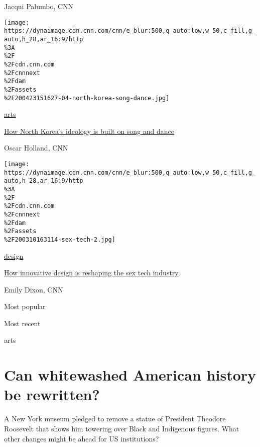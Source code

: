 Jacqui Palumbo, CNN

\href{/style/article/north-korea-song-dance/index.html}{}

\texttt{[image: https://dynaimage.cdn.cnn.com/cnn/e\_blur:500,q\_auto:low,w\_50,c\_fill,g\_auto,h\_28,ar\_16:9/http\\\%3A\\\%2F\\\%2Fcdn.cnn.com\\\%2Fcnnnext\\\%2Fdam\\\%2Fassets\\\%2F200423151627-04-north-korea-song-dance.jpg]}

\href{/style/arts}{arts}

\href{/style/article/north-korea-song-dance/index.html}{How North
Korea's ideology is built on song and dance}

Oscar Holland, CNN

\href{/style/article/sex-tech-design/index.html}{}

\texttt{[image: https://dynaimage.cdn.cnn.com/cnn/e\_blur:500,q\_auto:low,w\_50,c\_fill,g\_auto,h\_28,ar\_16:9/http\\\%3A\\\%2F\\\%2Fcdn.cnn.com\\\%2Fcnnnext\\\%2Fdam\\\%2Fassets\\\%2F200310163114-sex-tech-2.jpg]}

\href{/style/design}{design}

\href{/style/article/sex-tech-design/index.html}{How innovative design
is reshaping the sex tech industry}

Emily Dixon, CNN

Most popular

Most recent

\href{/style/arts}{}

arts

\href{/style/article/natural-history-museum-whitewashing-monuments-statues-trnd/index.html}{}

\hypertarget{can-whitewashed-american-history-be-rewritten}{%
\section{Can whitewashed American history be
rewritten?}\label{can-whitewashed-american-history-be-rewritten}}

\href{/style/article/natural-history-museum-whitewashing-monuments-statues-trnd/index.html}{}

A New York museum pledged to remove a statue of President Theodore
Roosevelt that shows him towering over Black and Indigenous figures.
What other changes might be ahead for US institutions?

